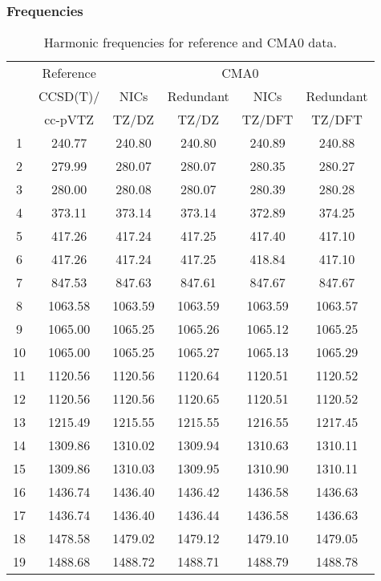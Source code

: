 \documentclass[10pt,oneside]{article}
\begin{document}
\begin{table}[h!]
\subsubsection*{Frequencies}
\centering
\caption{Harmonic frequencies for reference and CMA0 data.}
\begin{tabular}{cccccc}
\toprule
{} & Reference & \multicolumn{4}{c}{CMA0} \\
{} &  CCSD(T)/ &    NICs &  Redundant &    NICs & Redundant \\
{} &   cc-pVTZ &   TZ/DZ &      TZ/DZ &  TZ/DFT &    TZ/DFT \\
\midrule
1  &    240.77 &  240.80 &     240.80 &  240.89 &    240.88 \\
2  &    279.99 &  280.07 &     280.07 &  280.35 &    280.27 \\
3  &    280.00 &  280.08 &     280.07 &  280.39 &    280.28 \\
4  &    373.11 &  373.14 &     373.14 &  372.89 &    374.25 \\
5  &    417.26 &  417.24 &     417.25 &  417.40 &    417.10 \\
6  &    417.26 &  417.24 &     417.25 &  418.84 &    417.10 \\
7  &    847.53 &  847.63 &     847.61 &  847.67 &    847.67 \\
8  &   1063.58 & 1063.59 &    1063.59 & 1063.59 &   1063.57 \\
9  &   1065.00 & 1065.25 &    1065.26 & 1065.12 &   1065.25 \\
10 &   1065.00 & 1065.25 &    1065.27 & 1065.13 &   1065.29 \\
11 &   1120.56 & 1120.56 &    1120.64 & 1120.51 &   1120.52 \\
12 &   1120.56 & 1120.56 &    1120.65 & 1120.51 &   1120.52 \\
13 &   1215.49 & 1215.55 &    1215.55 & 1216.55 &   1217.45 \\
14 &   1309.86 & 1310.02 &    1309.94 & 1310.63 &   1310.11 \\
15 &   1309.86 & 1310.03 &    1309.95 & 1310.90 &   1310.11 \\
16 &   1436.74 & 1436.40 &    1436.42 & 1436.58 &   1436.63 \\
17 &   1436.74 & 1436.40 &    1436.44 & 1436.58 &   1436.63 \\
18 &   1478.58 & 1479.02 &    1479.12 & 1479.10 &   1479.05 \\
19 &   1488.68 & 1488.72 &    1488.71 & 1488.79 &   1488.78 \\

\end{tabular}
\end{table}
\end{document}
